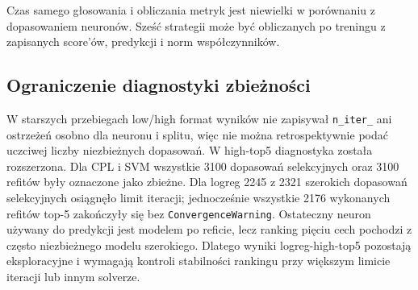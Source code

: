 \documentclass[11pt,a4paper]{article}
\begin{document}
Czas samego głosowania i obliczania metryk jest niewielki w porównaniu z dopasowaniem neuronów. Sześć
strategii może być obliczanych po treningu z zapisanych score'ów, predykcji i norm współczynników.

\subsection{Ograniczenie diagnostyki zbieżności}

W starszych przebiegach low/high format wyników nie zapisywał \texttt{n\_iter\_} ani ostrzeżeń osobno dla
neuronu i splitu, więc nie można retrospektywnie podać uczciwej liczby niezbieżnych dopasowań. W high-top5
diagnostyka została rozszerzona. Dla CPL i SVM wszystkie 3100 dopasowań selekcyjnych oraz 3100 refitów były
oznaczone jako zbieżne. Dla logreg 2245 z 2321 szerokich dopasowań selekcyjnych osiągnęło limit iteracji;
jednocześnie wszystkie 2176 wykonanych refitów top-5 zakończyły się bez \texttt{ConvergenceWarning}.
Ostateczny neuron używany do predykcji jest modelem po reficie, lecz ranking pięciu cech pochodzi z często
niezbieżnego modelu szerokiego. Dlatego wyniki logreg-high-top5 pozostają eksploracyjne i wymagają kontroli
stabilności rankingu przy większym limicie iteracji lub innym solverze.
\end{document}
